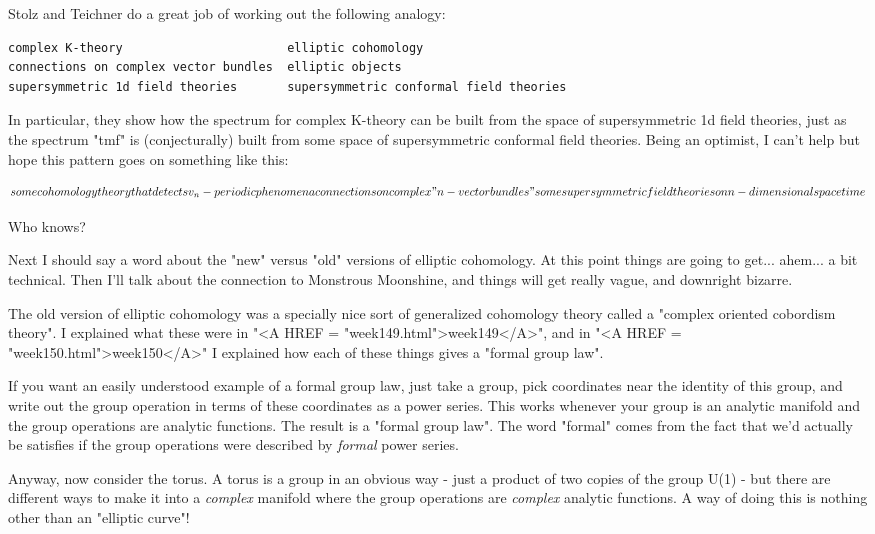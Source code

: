 Stolz and Teichner do a great job of working out the following analogy:

\begin{verbatim}
complex K-theory                       elliptic cohomology
connections on complex vector bundles  elliptic objects
supersymmetric 1d field theories       supersymmetric conformal field theories
\end{verbatim}
    
In particular, they show how the spectrum for complex K-theory
can be built from the space of supersymmetric 1d field theories,
just as the spectrum "tmf" is (conjecturally) built from some
space of supersymmetric conformal field theories.  Being an
optimist, I can't help but hope this pattern goes on something like this:

$$
some cohomology theory that detects v_{n}-periodic phenomena
connections on complex "n-vector bundles"
some supersymmetric field theories on n-dimensional spacetime
$$
    
Who knows?  

Next I should say a word about the "new" versus "old"
versions of elliptic cohomology.  At this
point things are going to get... ahem... a bit technical.
Then I'll talk about the connection to Monstrous Moonshine, and things will
get really vague, and downright bizarre.

The old version of elliptic cohomology was a specially nice sort
of generalized cohomology theory called a "complex oriented
cobordism theory".  I explained what these were in "<A HREF = "week149.html">week149</A>", and 
in "<A HREF = "week150.html">week150</A>" I explained how each of these things gives a "formal 
group law".  

If you want an easily understood example of a formal group law, 
just take a group, pick coordinates near the identity of this 
group, and write out the group operation in terms of these 
coordinates as a power series.  This works whenever your group is 
an analytic manifold and the group operations are analytic functions.
The result is a "formal group law".  The word "formal" comes from 
the fact that we'd actually be satisfies if the group operations
were described by \emph{formal} power series.

Anyway, now consider the torus.  A torus is a group in an obvious 
way - just a product of two copies of the group U(1) - but there 
are different ways to make it into a \emph{complex} manifold where 
the group operations are \emph{complex} analytic functions.  A way of 
doing this is nothing other than an "elliptic curve"!

